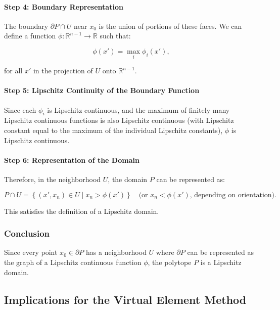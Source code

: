 \documentclass{article}
\begin{document}
\paragraph{Step 4: Boundary Representation}

The boundary \( \partial P \cap U \) near \( x_0 \) is the union of portions of these faces. We can define a function \( \phi: \mathbb{R}^{n-1} \rightarrow \mathbb{R} \) such that:

\[
\phi(x') = \max_{i} \phi_i(x'),
\]

for all \( x' \) in the projection of \( U \) onto \( \mathbb{R}^{n-1} \).

\paragraph{Step 5: Lipschitz Continuity of the Boundary Function}

Since each \( \phi_i \) is Lipschitz continuous, and the maximum of finitely many Lipschitz continuous functions is also Lipschitz continuous (with Lipschitz constant equal to the maximum of the individual Lipschitz constants), \( \phi \) is Lipschitz continuous.

\paragraph{Step 6: Representation of the Domain}

Therefore, in the neighborhood \( U \), the domain \( P \) can be represented as:

\[
P \cap U = \left\{ (x', x_n) \in U \mid x_n > \phi(x') \right\} \quad \text{(or } x_n < \phi(x') \text{, depending on orientation)}.
\]

This satisfies the definition of a Lipschitz domain.

\subsubsection{Conclusion}

Since every point \( x_0 \in \partial P \) has a neighborhood \( U \) where \( \partial P \) can be represented as the graph of a Lipschitz continuous function \( \phi \), the polytope \( P \) is a Lipschitz domain.

\subsection{Implications for the Virtual Element Method}
\end{document}
